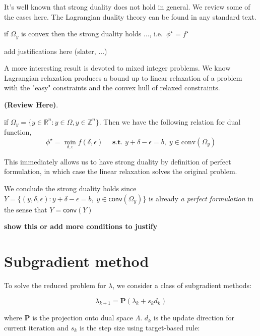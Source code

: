 It's well known that strong duality does not hold in general. We review
some of the cases here. The Lagrangian duality theory can be found in
any standard text.

\begin{theorem}
  if \(\Omega_y\) is convex then the strong duality holds ...,
  i.e.~\(\phi^\star = f^\star\)
\end{theorem}

add justifications here (slater, ...)

A more interesting result is devoted to mixed integer problems.
We know Lagrangian relaxation produces a bound up to
linear relaxation of a problem with the "easy" constraints
and the convex hull of relaxed constraints.

\textbf{(Review Here)}.

\begin{lemma}
  if \(\Omega_y = \{y \in \mathbb R^n: y \in \Omega, y\in \mathbb Z^n\}\).
  Then we have the following relation for dual function,
  \[ \phi^\star = \min_{\delta, \epsilon} f(\delta, \epsilon)\quad \textbf{ s.t. }  y + \delta - \epsilon = b,\; y \in \textrm{conv}(\Omega_y)\]
\end{lemma}

This immediately allows us to have strong duality by definition of perfect formulation,
in which case the linear relaxation solves the original problem.

\begin{corollary}\label{strong-ip}
  We conclude the strong duality holds since
  \(Y = \{(y, \delta, \epsilon): y + \delta - \epsilon = b,\; y \in \textsf{conv}(\Omega_y)\}\)
  is already \emph{a perfect formulation} in the sense that
  \(Y = \textsf{conv}(Y)\)
\end{corollary}

\textbf{show this or add more conditions to
  justify}


\hypertarget{subgradient-method}{%
  \section{Subgradient method}\label{subgradient-method}}

To solve the reduced problem for $\lambda$, we consider a class of subgradient
methods:

\begin{equation}\lambda_{k+1} = \mathbf{P}(\lambda_{k} + s_{k}d_{k})\end{equation}

where \(\mathbf P\) is the projection onto dual space \(\Lambda\).
\(d_k\) is the update direction for current iteration and \(s_{k}\) is
the step size using target-based rule:

